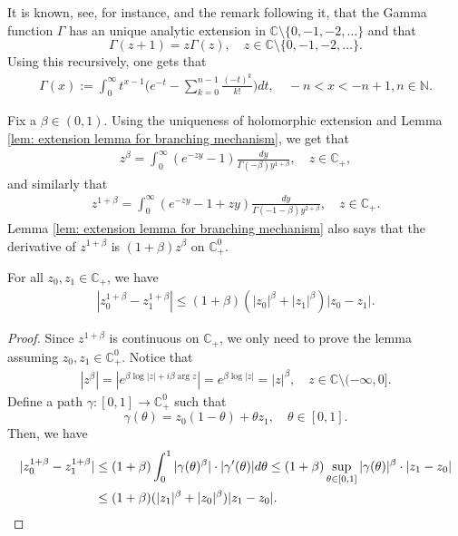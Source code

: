 \documentclass[EJP]{ejpecp} %
\begin{document}
It is known, see, for instance, \cite[Theorem 6.1.3]{SteinShakarchi2003Complex} and the remark following it, that the Gamma function $\Gamma$ has an unique analytic extension in $\mathbb C\setminus\{0, -1,-2,\dots\}$ and that
\[
	\Gamma(z+1)
  = z \Gamma(z),\quad z\in \mathbb C\setminus\{0, -1,-2,\dots\}.
\]
Using this recursively, one gets that
\begin{align}
  \label{eq: definition of Gamma function}
  \Gamma(x)
  := \int_0^\infty t^{x-1} \Big(e^{-t} - \sum_{k=0}^{n-1} \frac{(-t)^k}{k!}\Big) dt,
  \quad -n< x< -n+1, n\in \mathbb N.
\end{align}

Fix a $\beta \in (0,1)$.
Using the uniqueness of holomorphic extension and Lemma \ref{lem: extension lemma for branching mechanism}, we get that
\begin{align}
  z^{\beta}
	= \int_0^\infty (e^{-zy}-1) \frac{dy}{\Gamma(-\beta)y^{1+\beta}},
  \quad z\in \mathbb C_+,
\end{align}
and similarly that
\begin{align}
  \label{eq: stable branching on C+}
  z^{1+\beta}
  = \int_0^\infty (e^{-zy}-1+zy)\frac{dy}{\Gamma(-1-\beta)y^{2+\beta}},
  \quad z\in \mathbb C_+.
\end{align}
Lemma \ref{lem: extension lemma for branching mechanism} also says that the derivative of $z^{1+\beta}$ is $(1+\beta)z^{\beta}$ on $\mathbb C^0_+$.
\begin{lemma}
  \label{lem: Lip of power function}
  For all $z_0,z_1 \in \mathbb C_+$, we have
\begin{align}
  \label{eq: Lip of power function}
  |z_0^{1+\beta} - z_1^{1+\beta}|
  \leq (1+\beta)(|z_0|^{\beta}+|z_1|^{\beta})|z_0 - z_1|.
\end{align}
\end{lemma}
\begin{proof}
  Since $z^{1+\beta}$ is continuous on $\mathbb C_+$, we only need to prove the lemma assuming $z_0,z_1 \in \mathbb C^0_+$.
  Notice that
  \begin{align}
    \label{eq: upper bound for beta power of z}
    |z^\beta|
    = |e^{\beta \log |z| +i\beta \operatorname {arg}z}| = e^{\beta \log |z|} = |z|^\beta,
    \quad z \in \mathbb C\setminus (-\infty, 0].
  \end{align}
  Define a path $\gamma: [0,1] \to \mathbb C^0_+$ such that
  \[
    \gamma(\theta)
    = z_0 (1-\theta) + \theta z_1,
    \quad \theta \in [0,1].
  \]
  Then, we have
  \begin{align}
    |z_0^{1+\beta} - z_1^{1+\beta}|
    & \leq (1+\beta) \int_0^1 |\gamma(\theta)^{\beta}|\cdot |\gamma'(\theta)|d\theta
      \leq (1+\beta)  \sup_{\theta \in [0,1]} |\gamma(\theta)|^{\beta} \cdot |z_1-z_0| \\
    & \leq (1+\beta)  ( |z_1|^{\beta}+|z_0|^{\beta} ) |z_1-z_0|.
      \qedhere
  \end{align}
\end{proof}
\end{document}
